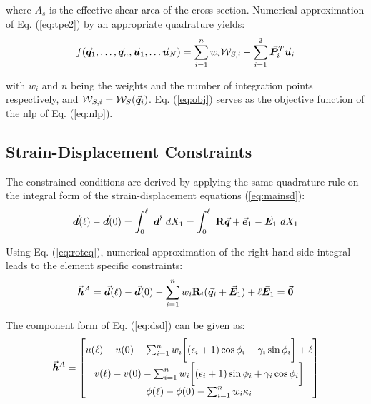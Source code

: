 \noindent where $A_s$ is the effective shear area of the cross-section. 
Numerical
approximation of Eq. (\ref{eq:tpe2}) by an appropriate quadrature yields:
\begin{gather}
	f(\vec{\boldsymbol{q}}_1,\ldots,\vec{\boldsymbol{q}}_n,\vec{\boldsymbol{u}}_1,\ldots\vec{\boldsymbol{u}}_N) = \sum_{i=1}^n
	w_i\mathcal{W}_{S,i} - \sum_{i=1}^2\vec{\boldsymbol{P}}^T_i\vec{\boldsymbol{u}}_i
	\label{eq:obj}
\end{gather}

\noindent with $w_i$ and $n$ being the weights and the number of integration
points respectively, and $\mathcal{W}_{S,i} = \mathcal{W}_S(\vec{\boldsymbol{q}}_i)$.
Eq. (\ref{eq:obj}) serves as the objective function of the \acrshort{nlp} of
Eq. (\ref{eq:nlp}).

\subsection{Strain-Displacement Constraints}\label{subsection:CH2-S3SS3}

The constrained conditions are derived by applying the same quadrature rule on
the integral form of the strain-displacement equations (\ref{eq:mainsd}):
\begin{gather}
	\bvec{d}(\ell)-\bvec{d}(0) = \int_0^\ell\ \bvec{d}'\ dX_1=\int_0^\ell\
	\bmat{R}\bvec{q}+\bvec{e}_1-\bvec{E}_1\ dX_1
	\label{eq:cintform}
\end{gather}

\noindent Using Eq. (\ref{eq:roteq}), numerical approximation of the right-hand
side integral leads to the element specific constraints:
\begin{gather}
	\vec{\boldsymbol{h}}^A = \vec{\boldsymbol{d}}(\ell)-\vec{\boldsymbol{d}}(0) - \sum_{i=1}^n
	w_i\mathbf{R}_i(\vec{\boldsymbol{q}}_i+\vec{\boldsymbol{E}}_1)+\ell\vec{\boldsymbol{E}}_1=\vec{\boldsymbol{0}}
	\label{eq:dsd}
\end{gather}


\noindent The component form of Eq. (\ref{eq:dsd}) can be given as:
\begin{gather}
	\vec{\boldsymbol{h}}^A = \begin{bmatrix}
		u(\ell)-u(0) - \sum_{i=1}^n w_i\bigg[(\epsilon_i+1)\cos\phi_i -
		\gamma_i\sin\phi_i\bigg] +\ell\\
		v(\ell)-v(0) - \sum_{i=1}^n w_i\bigg[(\epsilon_i+1)\sin\phi_i +
		\gamma_i\cos\phi_i\bigg]\\
		\phi(\ell)-\phi(0) - \sum_{i=1}^n w_i\kappa_i
	\end{bmatrix}
\end{gather}

